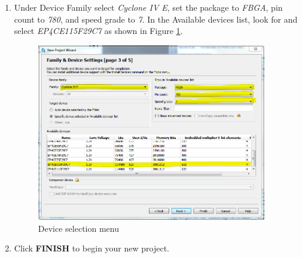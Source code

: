 \begin{enumerate}
	\item Under Device Family select \emph{Cyclone IV E}, set the package to \emph{FBGA}, pin count to \emph{780}, and speed grade to \emph{7}. In the Available devices list, look for and select \emph{EP4CE115F29C7} as shown in Figure \ref{fig:step2}.
	

	\begin{figure}[H]
		\centering
		\includegraphics[width=100mm]{Lab1/figures/step2.png}
		\caption{Device selection menu}
		\label{fig:step2}
	\end{figure}

	\item Click {\bf FINISH} to begin your new project.

\end{enumerate}

